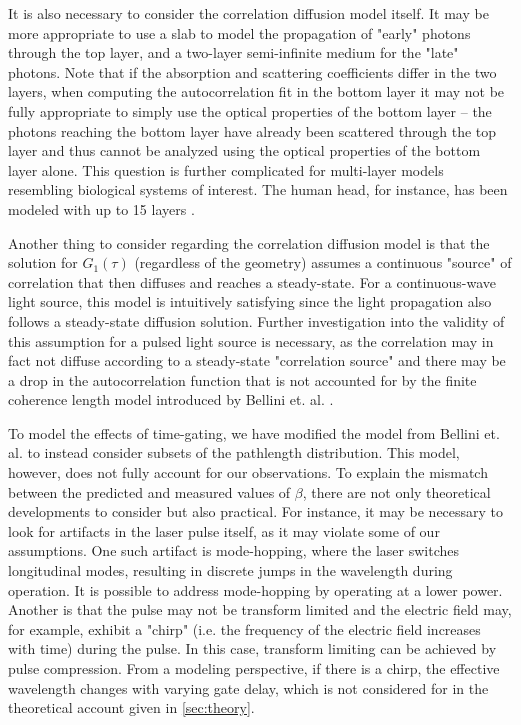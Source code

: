 It is also necessary to consider the correlation diffusion model itself. It may be more appropriate to use a slab to model the propagation of "early" photons through the top layer, and a two-layer semi-infinite medium for the "late" photons. Note that if the absorption and scattering coefficients differ in the two layers, when computing the autocorrelation fit in the bottom layer it may not be fully appropriate to simply use the optical properties of the bottom layer -- the photons reaching the bottom layer have already been scattered through the top layer and thus cannot be analyzed using the optical properties of the bottom layer alone. This question is further complicated for multi-layer models resembling biological systems of interest. The human head, for instance, has been modeled with up to 15 layers \cite{Steinbrink2001}.

Another thing to consider regarding the correlation diffusion model is that the solution for $G_1(\tau)$ (regardless of the geometry) assumes a continuous "source" of correlation that then diffuses and reaches a steady-state. For a continuous-wave light source, this model is intuitively satisfying since the light propagation also follows a steady-state diffusion solution. Further investigation into the validity of this assumption for a pulsed light source is necessary, as the correlation may in fact not diffuse according to a steady-state "correlation source" and there may be a drop in the autocorrelation function that is not accounted for by the finite coherence length model introduced by Bellini et. al. \cite{Bellini1991}. 

To model the effects of time-gating, we have modified the model from Bellini et. al. to instead consider subsets of the pathlength distribution. This model, however, does not fully account for our observations. To explain the mismatch between the predicted and measured values of $\beta$, there are not only theoretical developments to consider but also practical. For instance, it may be necessary to look for artifacts in the laser pulse itself, as it may violate some of our assumptions. One such artifact is mode-hopping, where the laser switches longitudinal modes, resulting in discrete jumps in the wavelength \cite{Heumier1992} during operation. It is possible to address mode-hopping by operating at a lower power. Another is that the pulse may not be transform limited and the electric field may, for example, exhibit a "chirp" (i.e. the frequency of the electric field increases with time) during the pulse. In this case, transform limiting can be achieved by pulse compression. From a modeling perspective, if there is a chirp, the effective wavelength changes with varying gate delay, which is not considered for in the theoretical account given in \autoref{sec:theory}.

